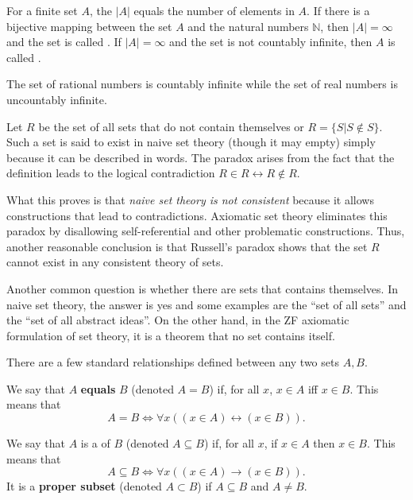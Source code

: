 \begin{definition}
For a finite set $A$, the  $|A|$ equals the number of elements in $A$.
If there is a bijective mapping between the set $A$ and the natural numbers $\mathbb{N}$, then $|A| = \infty$ and the set is called .
If $|A| = \infty$ and the set is not countably infinite, then $A$ is called .
\end{definition}

\begin{example}
The set of rational numbers is countably infinite while the set of real numbers is uncountably infinite.
\end{example}

\begin{example}
Let $R$ be the set of all sets that do not contain themselves or $R = \{S|S\notin S\}$.
Such a set is said to exist in naive set theory (though it may empty) simply because it can be described in words.
The paradox arises from the fact that the definition leads to the logical contradiction $R\in R \leftrightarrow R\notin R$.
\end{example}

What this proves is that \emph{naive set theory is not consistent} because it allows constructions that lead to contradictions.
Axiomatic set theory eliminates this paradox by disallowing self-referential and other problematic constructions.
Thus, another reasonable conclusion is that Russell's paradox shows that the set $R$ cannot exist in any consistent theory of sets.

Another common question is whether there are sets that contains themselves.
In naive set theory, the answer is yes and some examples are the ``set of all sets'' and the ``set of all abstract ideas''.
On the other hand, in the ZF axiomatic formulation of set theory, it is a theorem that no set contains itself.

There are a few standard relationships defined between any two sets $A,B$.
\begin{definition}
We say that $A$ \textbf{equals} $B$ (denoted $A=B$) if, for all $x$,  $x\in A$ iff $x\in B$.
This means that
\[ A=B \Leftrightarrow \forall x \left( (x\in A)\leftrightarrow (x\in B) \right). \]
\end{definition}

\begin{definition}
We say that $A$ is a  of $B$ (denoted $A\subseteq B$) if, for all $x$, if $x\in A$ then $x\in B$.
This means that
\[ A\subseteq B  \Leftrightarrow \forall x \left( (x\in A)\rightarrow (x\in B) \right). \]
It is a \textbf{proper subset} (denoted $A\subset B$) if $A\subseteq B$ and $A\neq B$.
\end{definition}

